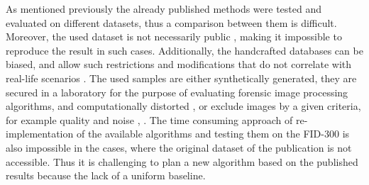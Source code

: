 \documentclass[draft,final]{vutinfth} %
\begin{document}
\par
As mentioned previously the already published methods were tested and evaluated on different datasets, thus a comparison between them is difficult.
Moreover, the used dataset is not necessarily public \cite{katireddy2017novel}, \cite{dardi2009texture} making it impossible to reproduce the result in such cases.
Additionally, the handcrafted databases can be biased, and allow such restrictions and modifications that do not correlate with real-life scenarios \cite{rida2019forensic}.
The used samples are either synthetically generated, they are secured in a laboratory for the purpose of evaluating forensic image processing algorithms, and computationally distorted \cite{de2005automated}, \cite{gueham2008automatic} or exclude images by a given criteria, for example quality and noise \cite{dardi2009texture}, \cite{tang2010footwear}.
The time consuming approach of re-implementation of the available algorithms and testing them on the FID-300 is also impossible in the cases, where the original dataset of the publication is not accessible.
Thus it is challenging to plan a new algorithm based on the published results because the lack of a uniform baseline.
\end{document}
